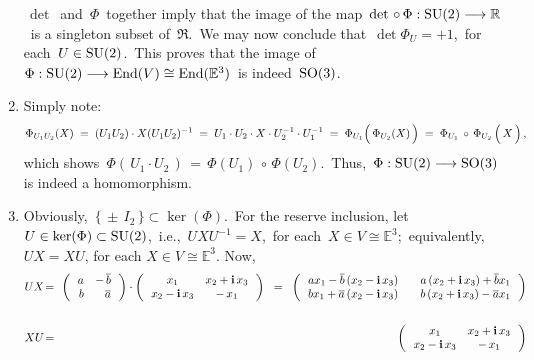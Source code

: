 \begin{enumerate}
	\,$\det$\, and \,$\Phi$\, together imply that the image of the map
	\,$\det \,\circ\, \Phi : \textnormal{SU}(2) \longrightarrow \mathbb{R}$\,
	is a singleton subset of \,$\Re$.\,
	We may now conclude that
	 \,$\det\Phi_{U} = + 1$,\,
	for each \,$U \in \textnormal{SU}(2)$.\,
	This proves that the image of
	\,$\Phi : \textnormal{SU}(2) \longrightarrow \textnormal{End}(V) \cong \textnormal{End}(\mathbb{E}^{3})$\,
	is indeed \,$\textnormal{SO}(3)$.
\item
	Simply note:
	\begin{equation*}
	\Phi_{U_{1}U_{2}}(X)
	\; = \;
		(U_{1}U_{2}) \cdot X (U_{1}U_{2})^{-1}
	\; = \;
		U_{1} \cdot U_{2} \cdot X \cdot U_{2}^{-1} \cdot U_{1}^{-1}
	\; = \;
		\Phi_{U_{1}}\!\left(\,\Phi_{U_{2}}(\overset{{\color{white}.}}{X})\,\right)
	\; = \;
		\Phi_{U_{1}} \,\circ\, \Phi_{U_{2}}\left(\,\overset{{\color{white}.}}{X}\,\right),
	\end{equation*}
	which shows
	\,$\Phi(\,U_{1} \cdot U_{2}\,) \, = \, \Phi(U_{1}) \,\circ\, \Phi(U_{2})$.\,
	Thus, \,$\Phi : \textnormal{SU}(2) \longrightarrow \textnormal{SO}(3)$\, is indeed a homomorphism.
\item
	Obviously, \,$\{\,\pm\,I_{2}\,\} \subset \ker(\Phi)$.\,
	For the reserve inclusion, let
	\,$U \in \ker(\Phi) \subset \textnormal{SU}(2)$,\,
	i.e.,
	\,$UXU^{-1} = X$,\, for each \,$X \in V \cong \mathbb{E}^{3}$;\,
	equivalently, $UX = XU$, for each $X \in V \cong \mathbb{E}^{3}$.
	Now,
	\begin{eqnarray*}
	U X
	& \!=\!\! &
		\left(\,\begin{array}{rr}
			a & -\,\overline{b}
			\\
			b & \overline{a}
			\end{array}\,\right)
		\cdot
		\left(\,\begin{array}{cc}
			x_{1} & x_{2} + \i\,x_{3}
			\\
			x_{2} - \i\,x_{3} & -\,x_{1}
			\end{array}\,\right)
	\;\; = \;\;
		\left(\,\begin{array}{cc}
			ax_{1} - \overline{b}\,(x_{2}-\i\,x_{3}) & {\color{white}-}\,a\,(x_{2}+\i\,x_{3}) + \overline{b}x_{1}
			\\
			bx_{1} + \overline{a}\,(x_{2}-\i\,x_{3}) & {\color{white}-}\,b\,(x_{2}+\i\,x_{3}) - \overline{a}x_{1}
			\end{array}\,\right)
	\\ \\
	X U
	& \!=\!\! &
		\left(\,\begin{array}{cc}
			x_{1} & x_{2} + \i\,x_{3}
			\\
			x_{2} - \i\,x_{3} & -\,x_{1}
			\end{array}\,\right)

\end{eqnarray*}
\end{enumerate}
